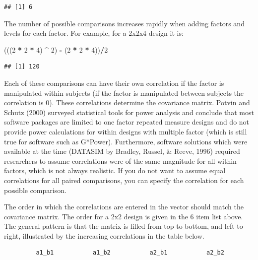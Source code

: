 \documentclass[]{book}
\newenvironment{Shaded}{\begin{snugshade}}{\end{snugshade}}
\newcommand{\DecValTok}[1]{\textcolor[rgb]{0.00,0.00,0.81}{#1}}
\newcommand{\NormalTok}[1]{#1}
\newcommand{\OperatorTok}[1]{\textcolor[rgb]{0.81,0.36,0.00}{\textbf{#1}}}
\newcommand{\StringTok}[1]{\textcolor[rgb]{0.31,0.60,0.02}{#1}}
\begin{document}
\begin{verbatim}
## [1] 6
\end{verbatim}

The number of possible comparisons increases rapidly when adding factors and levels for each factor. For example, for a 2x2x4 design it is:

\begin{Shaded}
\begin{Highlighting}[]
\NormalTok{(((}\DecValTok{2} \OperatorTok{*}\StringTok{ }\DecValTok{2} \OperatorTok{*}\StringTok{ }\DecValTok{4}\NormalTok{) }\OperatorTok{^}\StringTok{ }\DecValTok{2}\NormalTok{) }\OperatorTok{-}\StringTok{ }\NormalTok{(}\DecValTok{2} \OperatorTok{*}\StringTok{ }\DecValTok{2} \OperatorTok{*}\StringTok{ }\DecValTok{4}\NormalTok{))}\OperatorTok{/}\DecValTok{2}
\end{Highlighting}
\end{Shaded}

\begin{verbatim}
## [1] 120
\end{verbatim}

Each of these comparisons can have their own correlation if the factor is manipulated within subjects (if the factor is manipulated between subjects the correlation is 0). These correlations determine the covariance matrix. Potvin and Schutz (2000) surveyed statistical tools for power analysis and conclude that most software packages are limited to one factor repeated measure designs and do not provide power calculations for within designs with multiple factor (which is still true for software such as G*Power). Furthermore, software solutions which were available at the time (DATASIM by Bradley, Russel, \& Reeve, 1996) required researchers to assume correlations were of the same magnitude for all within factors, which is not always realistic. If you do not want to assume equal correlations for all paired comparisons, you can specify the correlation for each possible comparison.

The order in which the correlations are entered in the vector should match the covariance matrix.
The order for a 2x2 design is given in the 6 item list above. The general pattern is that the matrix is filled from top to bottom, and left to right, illustrated by the increasing correlations in the table below.

\begin{verbatim}
         a1_b1           a1_b2           a2_b1           a2_b2
\end{verbatim}
\end{document}
